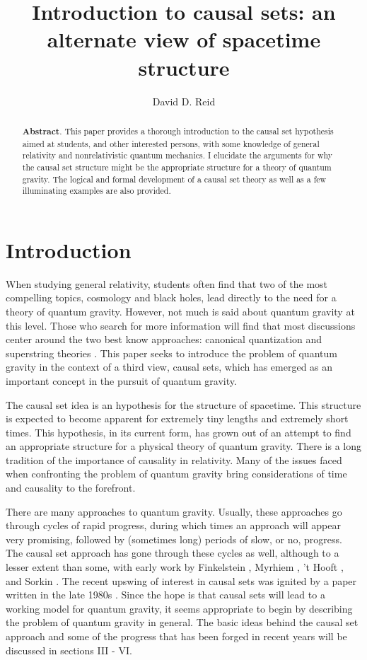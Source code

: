 \documentclass[aps,amssymb,12pt]{revtex4-2}
\begin{document}
\author{David D. Reid}
\address{Department of Physics and Astronomy\\
Eastern Michigan University, Ypsilanti, MI 48197}
\title{Introduction to causal sets: an alternate view of spacetime structure }
\begin{abstract}
{\bf Abstract}. This paper provides a thorough introduction to the causal
set hypothesis aimed at students, and other interested persons, with some
knowledge of general relativity and nonrelativistic quantum mechanics. I
elucidate the arguments for why the causal set structure might be the
appropriate structure for a theory of quantum gravity. The logical and
formal development of a causal set theory as well as a few illuminating
examples are also provided.
\end{abstract}
\maketitle

\section{Introduction}

When studying general relativity, students often find that two of the most
compelling topics, cosmology and black holes, lead directly to the need for
a theory of quantum gravity. However, not much is said about quantum gravity
at this level. Those who search for more information will find that most
discussions center around the two best know approaches: canonical
quantization \cite{1} and superstring theories \cite{2}. This paper seeks to introduce
the problem of quantum gravity in the context of a third view, causal sets,
which has emerged as an important concept in the pursuit of quantum gravity.

The causal set idea is an hypothesis for the structure of spacetime. This
structure is expected to become apparent for extremely tiny lengths and
extremely short times. This hypothesis, in its current form, has grown out
of an attempt to find an appropriate structure for a physical theory of
quantum gravity. There is a long tradition of the importance of causality in
relativity. Many of the issues faced when confronting the problem of quantum
gravity bring considerations of time and causality to the forefront.

There are many approaches to quantum gravity. Usually, these approaches go
through cycles of rapid progress, during which times an approach will appear
very promising, followed by (sometimes long) periods of slow, or no,
progress. The causal set approach has gone through these cycles as well,
although to a lesser extent than some, with early work by Finkelstein \cite{3},
Myrhiem \cite{4}, 't Hooft \cite{5}, and Sorkin \cite{6}. The recent upswing of interest in
causal sets was ignited by a paper written in the late 1980s \cite{7}. Since the
hope is that causal sets will lead to a working model for quantum gravity,
it seems appropriate to begin by describing the problem of quantum gravity
in general. The basic ideas behind the causal set approach and some of the
progress that has been forged in recent years will be discussed in sections
III - VI.
\end{document}
